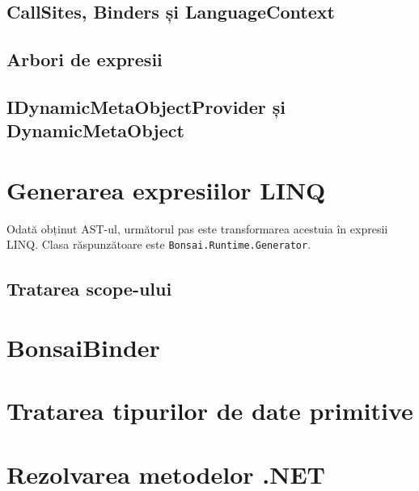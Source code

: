 \documentclass[12pt,a4paper]{memoir}
\begin{document}

\subsection{CallSites, Binders și LanguageContext}

\subsection{Arbori de expresii}

\subsection{IDynamicMetaObjectProvider și DynamicMetaObject}

\section{Generarea expresiilor LINQ}

Odată obținut AST-ul, următorul pas este transformarea acestuia în expresii LINQ\cite{linq_expressions}. Clasa răspunzătoare este \texttt{Bonsai.Runtime.Generator}.


\subsection{Tratarea scope-ului} 

\section{BonsaiBinder}


\section{Tratarea tipurilor de date primitive}


\section{Rezolvarea metodelor .NET}

\end{document}
